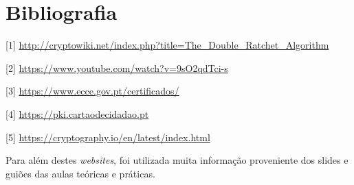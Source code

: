 \documentclass[10pt,english]{article}
\begin{document}
\clearpage

\section{Bibliografia}





\vspace{5mm} %

[1] \url{http://cryptowiki.net/index.php?title=The_Double_Ratchet_Algorithm}

[2] \url{https://www.youtube.com/watch?v=9sO2qdTci-s}

[3] \url{https://www.ecce.gov.pt/certificados/}

[4] \url{https://pki.cartaodecidadao.pt}

[5] \url{https://cryptography.io/en/latest/index.html}

\par Para além destes \textit{websites}, foi utilizada muita informação proveniente dos slides e guiões das aulas teóricas e práticas.
\end{document}
